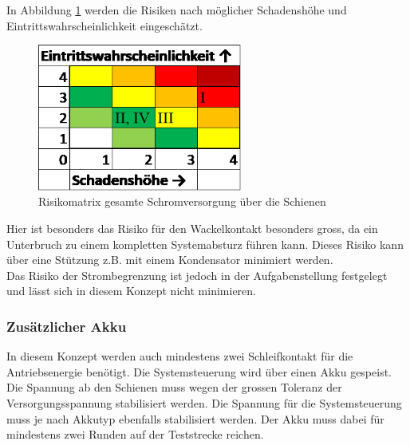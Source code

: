 \documentclass[../../main.tex]{subfiles}
\begin{document}
    In Abbildung \ref{fig:strom_risikomatrix_schienen} werden die Risiken nach möglicher Schadenshöhe und Eintrittswahrscheinlichkeit eingeschätzt.

    \begin{figure}[H]
        \centering
        \includegraphics[width=0.6\textwidth]{Strom_Risiko_Schienen.png}
        \caption {Risikomatrix gesamte Schromversorgung über die Schienen}
        \label{fig:strom_risikomatrix_schienen}
    \end{figure}

    Hier ist besonders das Risiko für den Wackelkontakt besonders gross, da ein Unterbruch zu einem kompletten Systemabsturz führen kann. Dieses Risiko kann über eine Stützung z.B. mit einem Kondensator minimiert werden.\\
    Das Risiko der Strombegrenzung ist jedoch in der Aufgabenstellung festgelegt und lässt sich in diesem Konzept nicht minimieren.

    \subsubsection{Zusätzlicher Akku}
    In diesem Konzept werden auch mindestens zwei Schleifkontakt für die Antriebsenergie benötigt. Die Systemsteuerung wird über einen Akku gespeist. Die Spannung ab den Schienen muss wegen der grossen Toleranz der Versorgungsspannung stabilisiert werden. Die Spannung für die Systemsteuerung muss je nach Akkutyp ebenfalls stabilisiert werden.
    Der Akku muss dabei für mindestens zwei Runden auf der Teststrecke reichen.
\end{document}
